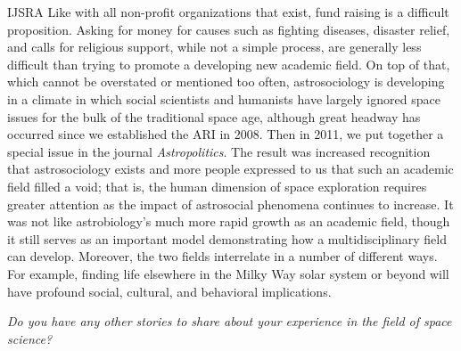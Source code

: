 \begin{labeling}{IJSRA}
	Like with all non-profit organizations that exist, fund raising is a difficult proposition. Asking for money for causes such as fighting diseases, disaster relief, and calls for religious support, while not a simple process, are generally less difficult than trying to promote a developing new academic field. On top of that, which cannot be overstated or mentioned too often, astrosociology is developing in a climate in which social scientists and humanists have largely ignored space issues for the bulk of the traditional space age, although great headway has occurred since we established the ARI in 2008. Then in 2011, we put together a special issue in the journal \emph{Astropolitics}. The result was increased recognition that astrosociology exists and more people expressed to us that such an academic field filled a void; that is, the human dimension of space exploration requires greater attention as the impact of astrosocial phenomena continues to increase. It was not like astrobiology’s much more rapid growth as an academic field, though it still serves as an important model demonstrating how a multidisciplinary field can develop. Moreover, the two fields interrelate in a number of different ways. For example, finding life elsewhere in the Milky Way solar system or beyond will have profound social, cultural, and behavioral implications.

	\item[IJSRA] \emph{Do you have any other stories to share about your experience in the field of space science?}


\end{labeling}
